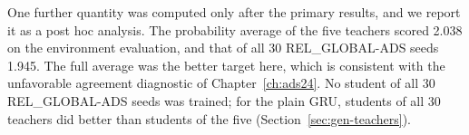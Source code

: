 One further quantity
was computed only after the primary results, and we report it as a
post hoc analysis. The probability average of the five teachers scored
2.038 on the environment evaluation, and that of all 30 REL\_GLOBAL-ADS
seeds 1.945. The full average was the better target here, which is
consistent with the unfavorable agreement diagnostic of Chapter~\ref{ch:ads24}. No
student of all 30 REL\_GLOBAL-ADS seeds was trained; for the plain GRU,
students of all 30 teachers did better than students of the five
(Section~\ref{sec:gen-teachers}).
